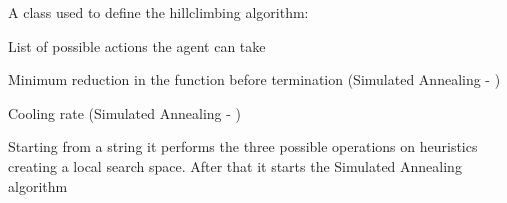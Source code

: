 \documentclass[letterpaper,10pt,english]{sphinxmanual}
\begin{document}
\begin{fulllineitems}
\label{\detokenize{index:algorithms.hillclimbing.climber}}
A class used to define the hillclimbing algorithm:

\begin{fulllineitems}
\label{\detokenize{index:algorithms.hillclimbing.climber.set_actions}}
List of possible actions the agent can take

\end{fulllineitems}


\begin{fulllineitems}
\label{\detokenize{index:algorithms.hillclimbing.climber.init_eps}}
Minimum reduction in the function before termination (Simulated Annealing - )

\end{fulllineitems}


\begin{fulllineitems}
\label{\detokenize{index:algorithms.hillclimbing.climber.set_cooling}}
Cooling rate (Simulated Annealing - )

\end{fulllineitems}


\begin{fulllineitems}
\label{\detokenize{index:algorithms.hillclimbing.climber.generate_local_space}}
Starting from a string it performs the three possible operations on heuristics creating a local search space.
After that it starts the Simulated Annealing algorithm


\end{fulllineitems}
\end{fulllineitems}
\end{document}
